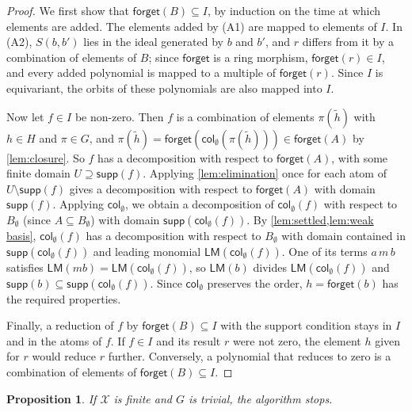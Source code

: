 \documentclass[12pt,a4paper,article]{memoir}
\newcommand{\struct}{\mathcal{X}}
\newcommand{\supp}{\mathsf{supp}}
\newcommand{\LM}{\mathsf{LM}}
\newcommand{\col}{\mathsf{col}}
\newcommand{\forget}{\mathsf{forget}}
\newtheorem{proposition}[theorem]{Proposition}
\theoremstyle{definition}
\begin{document}
\begin{proof}
We first show that $\forget(B) \subseteq I$, by induction on the time at which elements are added.
The elements added by (A1) are mapped to elements of $I$.
In (A2), $S(b, b')$ lies in the ideal generated by $b$ and $b'$, and $r$ differs from it by a combination of elements of $B$;
since $\forget$ is a ring morphism, $\forget(r) \in I$, and every added polynomial is mapped to a multiple of $\forget(r)$.
Since $I$ is equivariant, the orbits of these polynomials are also mapped into $I$.

Now let $f \in I$ be non-zero.
Then $f$ is a combination of elements $\pi(\tilde h)$ with $h \in H$ and $\pi \in G$,
and $\pi(\tilde h) = \forget(\col_\emptyset(\pi(\tilde h))) \in \forget(A)$ by \cref{lem:closure}.
So $f$ has a decomposition with respect to $\forget(A)$, with some finite domain $U \supseteq \supp(f)$.
Applying \cref{lem:elimination} once for each atom of $U \setminus \supp(f)$
gives a decomposition with respect to $\forget(A)$ with domain $\supp(f)$.
Applying $\col_\emptyset$, we obtain a decomposition of $\col_\emptyset(f)$ with respect to $B_\emptyset$
(since $A \subseteq B_\emptyset$) with domain $\supp(\col_\emptyset(f))$.
By \cref{lem:settled,lem:weak basis}, $\col_\emptyset(f)$ has a decomposition with respect to $B_\emptyset$
with domain contained in $\supp(\col_\emptyset(f))$ and leading monomial $\LM(\col_\emptyset(f))$.
One of its terms $a\, m\, b$ satisfies $\LM(m b) = \LM(\col_\emptyset(f))$,
so $\LM(b)$ divides $\LM(\col_\emptyset(f))$ and $\supp(b) \subseteq \supp(\col_\emptyset(f))$.
Since $\col_\emptyset$ preserves the order, $h = \forget(b)$ has the required properties.

Finally, a reduction of $f$ by $\forget(B) \subseteq I$ with the support condition stays in $I$ and in the atoms of $f$.
If $f \in I$ and its result $r$ were not zero, the element $h$ given for $r$ would reduce $r$ further.
Conversely, a polynomial that reduces to zero is a combination of elements of $\forget(B) \subseteq I$.
\end{proof}

\begin{proposition}\label{prop:termination}
If $\struct$ is finite and $G$ is trivial, the algorithm stops.
\end{proposition}
\end{document}
